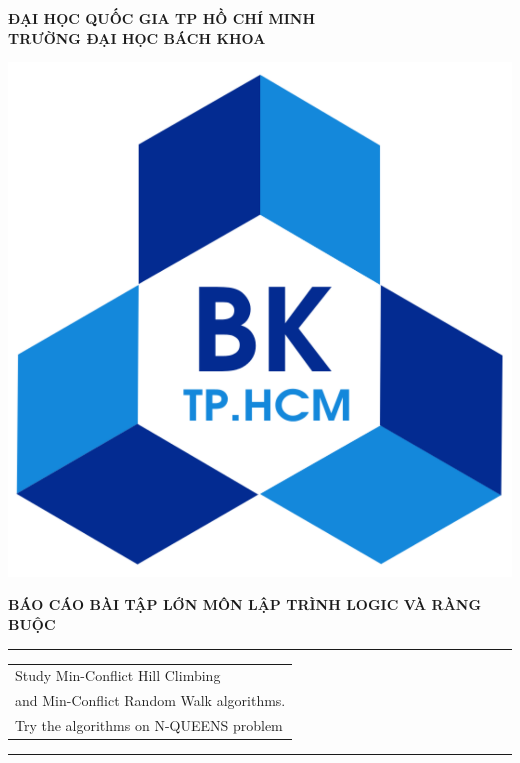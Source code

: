 \documentclass{hcmutarticle}
\begin{document}
\thispagestyle{empty}
\begin{center}
\LARGE\bfseries ĐẠI HỌC QUỐC GIA TP HỒ CHÍ MINH \\
TRƯỜNG ĐẠI HỌC BÁCH KHOA
\end{center}

\begin{center}
\includegraphics[scale=0.2]{hcmut.pdf}\\[1cm]
\end{center}

\vspace{1cm}

\begin{center}
\Large \bfseries BÁO CÁO BÀI TẬP LỚN MÔN LẬP TRÌNH LOGIC VÀ RÀNG BUỘC\\[0.5cm]
\end{center}
\rule{\textwidth}{1pt}
\vspace{2pt}
\begin{center}
\Huge
\begin{tabular}{@{}l}
Study Min-Conflict Hill Climbing
\\and Min-Conflict Random Walk algorithms.
\\Try the algorithms on N-QUEENS problem\\[6pt]
\end{tabular}
\end{center}
\rule{\textwidth}{1pt}\\[1cm]
\end{document}
